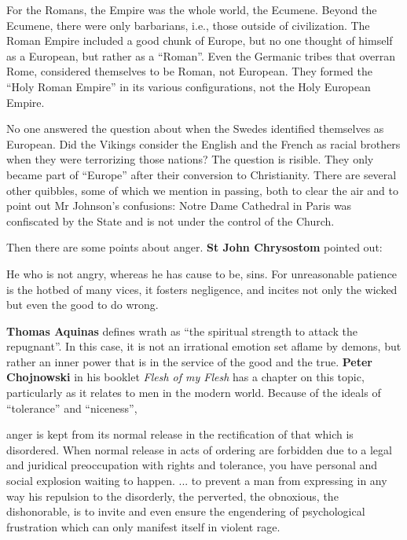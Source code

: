For the Romans, the Empire was the whole world, the Ecumene. Beyond the Ecumene, there were only barbarians, i.e., those outside of civilization. The Roman Empire included a good chunk of Europe, but no one thought of himself as a European, but rather as a ``Roman''. Even the Germanic tribes that overran Rome, considered themselves to be Roman, not European. They formed the ``Holy Roman Empire'' in its various configurations, not the Holy European Empire.

No one answered the question about when the Swedes identified themselves as European. Did the Vikings consider the English and the French as racial brothers when they were terrorizing those nations? The question is risible. They only became part of ``Europe'' after their conversion to Christianity. There are several other quibbles, some of which we mention in passing, both to clear the air and to point out Mr Johnson's confusions: Notre Dame Cathedral in Paris was confiscated by the State and is not under the control of the Church.

Then there are some points about anger. \textbf{St John Chrysostom} pointed out:

\begin{quotex}
He who is not angry, whereas he has cause to be, sins. For unreasonable patience is the hotbed of many vices, it fosters negligence, and incites not only the wicked but even the good to do wrong.
\end{quotex}


\textbf{Thomas Aquinas} defines wrath as ``the spiritual strength to attack the repugnant''. In this case, it is not an irrational emotion set aflame by demons, but rather an inner power that is in the service of the good and the true. \textbf{Peter Chojnowski} in his booklet \textit{Flesh of my Flesh} has a chapter on this topic, particularly as it relates to men in the modern world. Because of the ideals of ``tolerance'' and ``niceness'',

\begin{quotex}
anger is kept from its normal release in the rectification of that which is disordered. When normal release in acts of ordering are forbidden due to a legal and juridical preoccupation with rights and tolerance, you have personal and social explosion waiting to happen. ... to prevent a man from expressing in any way his repulsion to the disorderly, the perverted, the obnoxious, the dishonorable, is to invite and even ensure the engendering of psychological frustration which can only manifest itself in violent rage.
\end{quotex}


